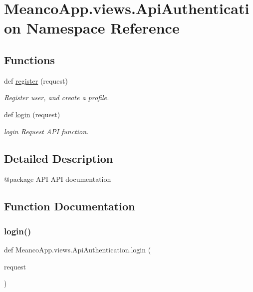 \hypertarget{namespace_meanco_app_1_1views_1_1_api_authentication}{}\section{Meanco\+App.\+views.\+Api\+Authentication Namespace Reference}
\label{namespace_meanco_app_1_1views_1_1_api_authentication}
\subsection*{Functions}
\begin{DoxyCompactItemize}
\item 
def \hyperlink{namespace_meanco_app_1_1views_1_1_api_authentication_af77e576094ba5aac7cb8bb6ec321aecc}{register} (request)
\begin{DoxyCompactList}\small\item\em Register user, and create a profile. \end{DoxyCompactList}\item 
def \hyperlink{namespace_meanco_app_1_1views_1_1_api_authentication_acc1296164cadd28790e34f36250716f5}{login} (request)
\begin{DoxyCompactList}\small\item\em login Request A\+PI function. \end{DoxyCompactList}\end{DoxyCompactItemize}


\subsection{Detailed Description}
\begin{DoxyVerb}@package API
API documentation\end{DoxyVerb}
 

\subsection{Function Documentation}
\hypertarget{namespace_meanco_app_1_1views_1_1_api_authentication_acc1296164cadd28790e34f36250716f5}{}\label{namespace_meanco_app_1_1views_1_1_api_authentication_acc1296164cadd28790e34f36250716f5} 
\subsubsection{\texorpdfstring{login()}{login()}}
{\footnotesize\ttfamily def Meanco\+App.\+views.\+Api\+Authentication.\+login (\begin{DoxyParamCaption}\item[{}]{request }\end{DoxyParamCaption})}



